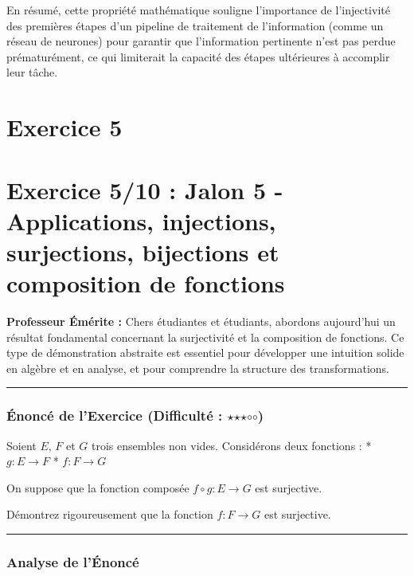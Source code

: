 \documentclass[12pt,a4paper]{report}
\begin{document}
En résumé, cette propriété mathématique souligne l'importance de
l'injectivité des premières étapes d'un pipeline de traitement de
l'information (comme un réseau de neurones) pour garantir que
l'information pertinente n'est pas perdue prématurément, ce qui
limiterait la capacité des étapes ultérieures à accomplir leur tâche.
\newpage
\section{Exercice 5}
\section{Exercice 5/10 : Jalon 5 - Applications, injections,
surjections, bijections et composition de
fonctions}\label{exercice-510-jalon-5---applications-injections-surjections-bijections-et-composition-de-fonctions}

\textbf{Professeur Émérite :} Chers étudiantes et étudiants, abordons
aujourd'hui un résultat fondamental concernant la surjectivité et la
composition de fonctions. Ce type de démonstration abstraite est
essentiel pour développer une intuition solide en algèbre et en analyse,
et pour comprendre la structure des transformations.

\begin{center}\rule{0.5\linewidth}{0.5pt}\end{center}

\subsubsection{\texorpdfstring{Énoncé de l'Exercice (Difficulté :
\(\star\)\(\star\)\(\star\)$\circ$$\circ$)}{Énoncé de l'Exercice (Difficulté : \textbackslash star\textbackslash star\textbackslash star$\circ$$\circ$)}}\label{uxe9noncuxe9-de-lexercice-difficultuxe9-starstarstar}

Soient \(E\), \(F\) et \(G\) trois ensembles non vides. Considérons deux
fonctions : * \(g: E \to F\) * \(f: F \to G\)

On suppose que la fonction composée \(f \circ g: E \to G\) est
surjective.

Démontrez rigoureusement que la fonction \(f: F \to G\) est surjective.

\begin{center}\rule{0.5\linewidth}{0.5pt}\end{center}

\subsubsection{Analyse de l'Énoncé}\label{analyse-de-luxe9noncuxe9}
\end{document}
